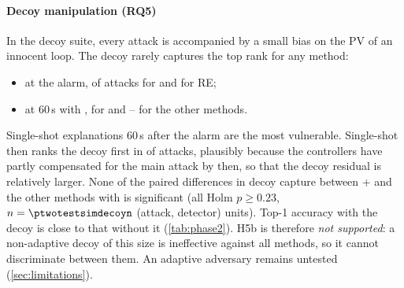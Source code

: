 \paragraph{Decoy manipulation (RQ5)} In the decoy suite, every attack is accompanied by a small bias on the PV of an innocent loop. The decoy rarely captures the top rank for any method:
\begin{itemize}
\item at the alarm, \ptwosimdecoyLXsingleZerodecoytopOne{} of attacks for \LX{} and \ptwosimdecoyREsingleZerodecoytopOne{} for RE;
\item at 60\,s with \TEA, \ptwosimdecoyLXteaSixZerodecoytopOne{} for \LX{} and \ptwosimdecoyIGteaSixZerodecoytopOne--\ptwosimdecoyKSOneZeroTwoFourteaSixZerodecoytopOne{} for the other methods.
\end{itemize}
Single-shot explanations 60\,s after the alarm are the most vulnerable. Single-shot \LX{} then ranks the decoy first in \ptwosimdecoyLXsingleSixZerodecoytopOne{} of attacks, plausibly because the controllers have partly compensated for the main attack by then, so that the decoy residual is relatively larger. None of the paired differences in decoy capture between \LX+\TEA{} and the other methods with \TEA{} is significant (all Holm $p\ge0.23$, $n=\ptwotestsimdecoyn$ (attack, detector) units). Top-1 accuracy with the decoy is close to that without it (\cref{tab:phase2}). H5b is therefore \emph{not supported}: a non-adaptive decoy of this size is ineffective against all methods, so it cannot discriminate between them. An adaptive adversary remains untested (\cref{sec:limitations}).
